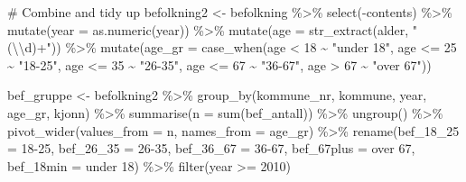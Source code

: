 \documentclass[
  norsk,
  letterpaper,
  DIV=11,
  numbers=noendperiod]{scrreprt}
\newenvironment{Shaded}{\begin{snugshade}}{\end{snugshade}}
\newcommand{\AttributeTok}[1]{\textcolor[rgb]{0.40,0.45,0.13}{#1}}
\newcommand{\CommentTok}[1]{\textcolor[rgb]{0.37,0.37,0.37}{#1}}
\newcommand{\DecValTok}[1]{\textcolor[rgb]{0.68,0.00,0.00}{#1}}
\newcommand{\FunctionTok}[1]{\textcolor[rgb]{0.28,0.35,0.67}{#1}}
\newcommand{\NormalTok}[1]{\textcolor[rgb]{0.00,0.23,0.31}{#1}}
\newcommand{\OtherTok}[1]{\textcolor[rgb]{0.00,0.23,0.31}{#1}}
\newcommand{\SpecialCharTok}[1]{\textcolor[rgb]{0.37,0.37,0.37}{#1}}
\newcommand{\StringTok}[1]{\textcolor[rgb]{0.13,0.47,0.30}{#1}}
\theoremstyle{definition}
\theoremstyle{remark}
\begin{document}
\begin{Shaded}
\begin{Highlighting}[]
\CommentTok{\# Combine and tidy up}
\NormalTok{befolkning2 }\OtherTok{\textless{}{-}}\NormalTok{ befolkning }\SpecialCharTok{\%\textgreater{}\%} 
  \FunctionTok{select}\NormalTok{(}\SpecialCharTok{{-}}\NormalTok{contents) }\SpecialCharTok{\%\textgreater{}\%} 
  \FunctionTok{mutate}\NormalTok{(}\AttributeTok{year =} \FunctionTok{as.numeric}\NormalTok{(year)) }\SpecialCharTok{\%\textgreater{}\%} 
  \FunctionTok{mutate}\NormalTok{(}\AttributeTok{age =} \FunctionTok{str\_extract}\NormalTok{(alder, }\StringTok{"(}\SpecialCharTok{\textbackslash{}\textbackslash{}}\StringTok{d)+"}\NormalTok{)) }\SpecialCharTok{\%\textgreater{}\%} 
  \FunctionTok{mutate}\NormalTok{(}\AttributeTok{age\_gr =} \FunctionTok{case\_when}\NormalTok{(age }\SpecialCharTok{\textless{}} \DecValTok{18} \SpecialCharTok{\textasciitilde{}} \StringTok{"under 18"}\NormalTok{, }
\NormalTok{                            age }\SpecialCharTok{\textless{}=} \DecValTok{25} \SpecialCharTok{\textasciitilde{}} \StringTok{"18{-}25"}\NormalTok{,}
\NormalTok{                            age }\SpecialCharTok{\textless{}=} \DecValTok{35} \SpecialCharTok{\textasciitilde{}} \StringTok{"26{-}35"}\NormalTok{, }
\NormalTok{                            age }\SpecialCharTok{\textless{}=} \DecValTok{67} \SpecialCharTok{\textasciitilde{}} \StringTok{"36{-}67"}\NormalTok{, }
\NormalTok{                            age }\SpecialCharTok{\textgreater{}} \DecValTok{67} \SpecialCharTok{\textasciitilde{}} \StringTok{"over 67"}\NormalTok{)) }

\NormalTok{bef\_gruppe }\OtherTok{\textless{}{-}}\NormalTok{ befolkning2 }\SpecialCharTok{\%\textgreater{}\%} 
  \FunctionTok{group\_by}\NormalTok{(kommune\_nr, kommune, year, age\_gr, kjonn) }\SpecialCharTok{\%\textgreater{}\%} 
  \FunctionTok{summarise}\NormalTok{(}\AttributeTok{n =} \FunctionTok{sum}\NormalTok{(bef\_antall)) }\SpecialCharTok{\%\textgreater{}\%} 
  \FunctionTok{ungroup}\NormalTok{() }\SpecialCharTok{\%\textgreater{}\%} 
  \FunctionTok{pivot\_wider}\NormalTok{(}\AttributeTok{values\_from =}\NormalTok{ n, }\AttributeTok{names\_from =}\NormalTok{ age\_gr) }\SpecialCharTok{\%\textgreater{}\%} 
  \FunctionTok{rename}\NormalTok{(}\AttributeTok{bef\_18\_25 =} \StringTok{\textasciigrave{}}\AttributeTok{18{-}25}\StringTok{\textasciigrave{}}\NormalTok{, }\AttributeTok{bef\_26\_35 =} \StringTok{\textasciigrave{}}\AttributeTok{26{-}35}\StringTok{\textasciigrave{}}\NormalTok{, }\AttributeTok{bef\_36\_67 =} \StringTok{\textasciigrave{}}\AttributeTok{36{-}67}\StringTok{\textasciigrave{}}\NormalTok{, }
         \AttributeTok{bef\_67plus =} \StringTok{\textasciigrave{}}\AttributeTok{over 67}\StringTok{\textasciigrave{}}\NormalTok{, }\AttributeTok{bef\_18min =} \StringTok{\textasciigrave{}}\AttributeTok{under 18}\StringTok{\textasciigrave{}}\NormalTok{) }\SpecialCharTok{\%\textgreater{}\%} 
  \FunctionTok{filter}\NormalTok{(year }\SpecialCharTok{\textgreater{}=} \DecValTok{2010}\NormalTok{) }
  

\end{Highlighting}
\end{Shaded}
\end{document}
